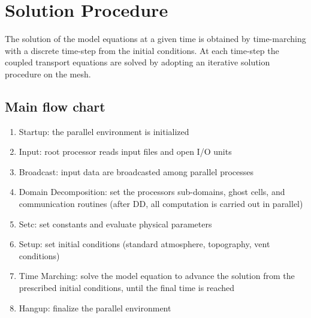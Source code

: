 \section{\label{sect:solproc} Solution Procedure}
%
The solution of the model equations at a given time is obtained by time-marching
with a discrete time-step from the initial conditions. At each time-step the
coupled transport equations are solved by adopting an iterative solution 
procedure on the mesh.

\subsection{Main flow chart}

\begin{enumerate}
\item Startup: the parallel environment is initialized
\item Input: root processor reads input files and open I/O units
\item Broadcast: input data are broadcasted among parallel processes
\item Domain Decomposition: set the processors sub-domains, ghost cells, and communication routines
(after DD, all computation is carried out in parallel)
\item Setc: set constants and evaluate physical parameters
\item Setup: set initial conditions (standard atmosphere, topography, vent conditions)
\item Time Marching: solve the model equation to advance the solution from the prescribed initial conditions,
until the final time is reached
\item Hangup: finalize the parallel environment
\end{enumerate}

